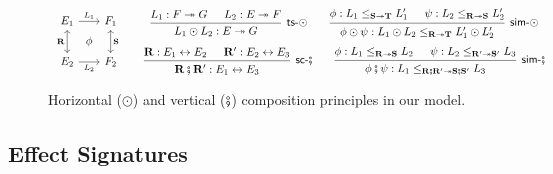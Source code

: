 \documentclass[acmsmall,screen,review,anonymous,nonacm]{acmart}
\newcommand{\kw}[1]{\ensuremath{ \mathsf{#1} }}
\newcommand{\vcomp}{\fatsemi}
\begin{document}


\begin{figure} %
  \[
  \begin{array}{c}
    \begin{tikzcd}[sep=0.5ex]
      E_1 \ar[dd, leftrightarrow, "\mathbf{R}"']
	  \ar[rr, "L_1"] &&
      F_1 \ar[dd, leftrightarrow, "\mathbf{S}"] \\
      & \phi & \\
      E_2 \ar[rr, "L_2"'] &&
      F_2
    \end{tikzcd}
  \end{array}
  \quad
  \begin{array}{c}
    \begin{prooftree}
      \hypo{L_1 : F \twoheadrightarrow G}
      \hypo{L_2 : E \twoheadrightarrow F}
      \infer2[\kw{ts}-$\odot$]{L_1 \odot L_2 : E \twoheadrightarrow G}
    \end{prooftree}
    \qquad
    \begin{prooftree}
      \hypo{\phi: L_1 \le_{\mathbf{S} \twoheadrightarrow \mathbf{T}} L_1'}
      \hypo{\psi: L_2 \le_{\mathbf{R} \twoheadrightarrow \mathbf{S}} L_2'}
      \infer2[\kw{sim}-$\odot$]{\phi \odot \psi :
	L_1 \odot L_2 \le_{\mathbf{R} \twoheadrightarrow \mathbf{T}} L_1' \odot L_2'}
    \end{prooftree}
    \\[1.5em]
    \begin{prooftree}
      \hypo{\mathbf{R} : E_1 \leftrightarrow E_2}
      \hypo{\mathbf{R}' : E_2 \leftrightarrow E_3}
      \infer2[\kw{sc}-$\vcomp$]{\mathbf{R} \vcomp \mathbf{R}' : E_1 \leftrightarrow E_3}
    \end{prooftree}
    \qquad
    \begin{prooftree}
      \hypo{\phi : L_1 \le_{\mathbf{R} \twoheadrightarrow \mathbf{S}} L_2}
      \hypo{\psi : L_2 \le_{\mathbf{R'} \twoheadrightarrow \mathbf{S'}} L_3}
      \infer2[\kw{sim}-$\vcomp$]{\phi \vcomp \psi : L_1 \le_{\mathbf{R} \vcomp \mathbf{R'} \twoheadrightarrow
	\mathbf{S} \vcomp \mathbf{S'}} L_3}
    \end{prooftree}
  \end{array}
\]
  \caption{Horizontal ($\odot$) and vertical ($\vcomp$)
    composition principles in our model.}
  \label{fig:hvcomp}
\end{figure}

\subsection{Effect Signatures} \label{sec:esig} %
\end{document}
